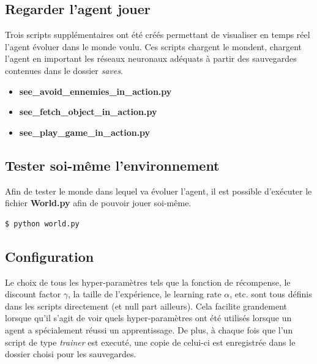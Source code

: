 \documentclass[11pt,a4paper]{report}
\begin{document}
  \subsection{Regarder l'agent jouer}
  
  \par Trois scripts supplémentaires ont été créés permettant de visualiser en temps réel l'agent évoluer dans le monde voulu. Ces scripts chargent le mondent, chargent l'agent en important les réseaux neuronaux adéquats à partir des sauvegardes contenues dans le dossier \textit{saves}. 

  \renewcommand{\labelitemi}{\textbullet}
  \begin{itemize}
  \item \textbf{see\_avoid\_ennemies\_in\_action.py}
  \item \textbf{see\_fetch\_object\_in\_action.py}
  \item \textbf{see\_play\_game\_in\_action.py}
  \end{itemize}
  
  \subsection{Tester soi-même l'environnement}
  
  \par Afin de tester le monde dans lequel va évoluer l'agent, il est possible d’exécuter le fichier \textbf{World.py} afin de pouvoir jouer soi-même. 
  
  \begin{lstlisting}[language=bash]
  $ python world.py
  \end{lstlisting} 
  
  \subsection{Configuration}
  
  \par Le choix de tous les hyper-paramètres tels que la fonction de récompense, le discount factor $\gamma$, la taille de l’expérience, le learning rate $\alpha$, etc. sont tous définis dans les scripts directement (et null part ailleurs). Cela facilite grandement lorsque qu'il s'agit de voir quels hyper-paramètres ont été utilisés lorsque un agent a spécialement réussi un apprentissage. De plus, à chaque fois que l'un script de type \textit{trainer} est executé, une copie de celui-ci est enregistrée dans le dossier choisi pour les sauvegardes. 
  
\end{document}
